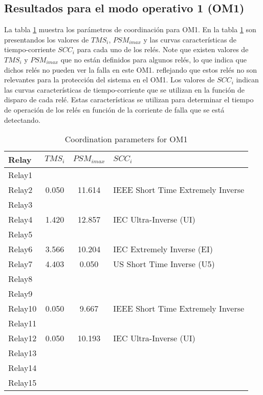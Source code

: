\documentclass[journal,article,submit,pdftex,moreauthors]{Definitions/mdpi}
\begin{document}
\subsection{Resultados para el modo operativo 1 (OM1)}

La tabla \ref{tablaDialOM1} muestra los parámetros de coordinación para OM1. En la tabla \ref{tablaDialOM1} son presentandos los valores de $TMS_i$, $PSM_{imax}$ y las curvas características de tiempo-corriente $SCC_i$ para cada uno de los relés. Note que existen valores de $TMS_i$ y $PSM_{imax}$ que no están definidos para algunos relés, lo que indica que dichos relés no pueden ver la falla en este OM1. reflejando que estos relés no son relevantes para la protección del sistema en el OM1. Los valores de $SCC_i$ indican las curvas características de tiempo-corriente que se utilizan en la función de disparo de cada relé. Estas características se utilizan para determinar el tiempo de operación de los relés en función de la corriente de falla que se está detectando. 

\begin{table}[H]
\caption{Coordination parameters for OM1}
\label{tablaDialOM1}
\centering
\begin{tabular}{lccl}
\toprule
\textbf{Relay }	& \textbf{ $TMS_i$} &     \textbf{ $PSM_{imax}$} & \textbf{$SCC_i$}\\
\midrule
Relay1 &  &  &  \\ 
Relay2 & 0.050 & 11.614 & IEEE Short Time Extremely Inverse \\
Relay3 &  &  &  \\ 
Relay4 & 1.420 & 12.857 & IEC Ultra-Inverse (UI) \\
Relay5 &  &  &  \\ 
Relay6 & 3.566 & 10.204 & IEC Extremely Inverse (EI) \\
Relay7 & 4.403 & 0.050 & US Short Time Inverse (U5) \\
Relay8 &  &  &  \\ 
Relay9 &  &  &  \\ 
Relay10 & 0.050 & 9.667 & IEEE Short Time Extremely Inverse \\
Relay11 &  &  &  \\ 
Relay12 & 0.050 & 10.193 & IEC Ultra-Inverse (UI) \\
Relay13 &  &  &  \\ 
Relay14 &  &  &  \\ 
Relay15 &  &  &  \\ 
\bottomrule
\end{tabular}
\end{table}
\end{document}
